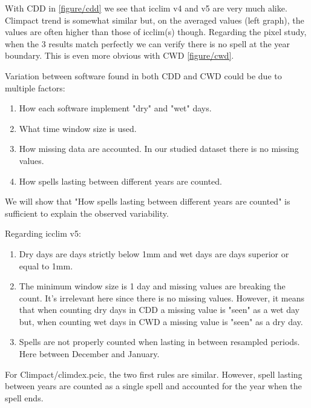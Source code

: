 \documentclass[a4paper,11pt]{article}
\begin{document}
            With CDD in \ref{figure/cdd} we see that icclim v4 and v5 are very much alike.
            Climpact trend is somewhat similar but, on the averaged values (left graph), the values are often higher than those of icclim(s) though.
            Regarding the pixel study, when the 3 results match perfectly we can verify there is no spell at the year boundary.
            This is even more obvious with CWD \ref{figure/cwd}.

            Variation between software found in both CDD and CWD could be due to multiple factors:
            
            \begin{minipage}{\linewidth}
            \begin{enumerate}
                \item How each software implement "dry" and "wet" days.
                \item What time window size is used.
                \item How missing data are accounted. In our studied dataset there is no missing values.
                \item How spells lasting between different years are counted.
            \end{enumerate}
            \end{minipage}

            We will show that "How spells lasting between different years are counted" is sufficient to explain the observed variability.

            Regarding icclim v5:
            \begin{enumerate}
                \item Dry days are days strictly below 1mm and wet days are days superior or equal to 1mm.
                \item The minimum window size is 1 day and missing values are breaking the count. 
                    It's irrelevant here since there is no missing values. However, it means that when counting dry days in CDD a missing value is "seen" as a wet day but, when counting wet days in CWD a missing value is "seen" as a dry day.
                \item Spells are not properly counted when lasting in between resampled periods. Here between December and January.
            \end{enumerate}
            For Climpact/climdex.pcic, the two first rules are similar. 
            However, spell lasting between years are counted as a single spell and accounted for the year when the spell ends.
            
\end{document}
